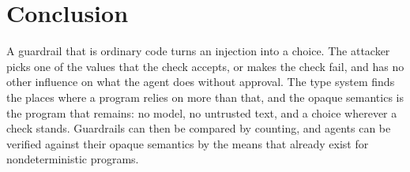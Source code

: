 \documentclass[acmsmall,nonacm,screen]{acmart}
\begin{document}
\section{Conclusion}

A guardrail that is ordinary code turns an injection into a choice. The attacker picks one
of the values that the check accepts, or makes the check fail, and has no other influence
on what the agent does without approval. The type system finds the places where a program
relies on more than that, and the opaque semantics is the program that remains: no model, no
untrusted text, and a choice wherever a check stands. Guardrails can then be compared by
counting, and agents can be verified against their opaque semantics by the means that
already exist for nondeterministic programs.



\end{document}
